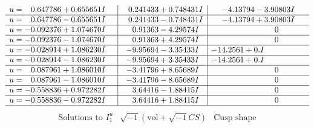 \documentclass[1p]{elsarticle_modified}
\theoremstyle{definition}
\newcommand{\I}{\sqrt{-1}}
\begin{document}
$$\begin{array}{c|c|c}
\begin{aligned}
u &= \phantom{-}0.647786 + 0.655651 I\end{aligned}
 & \phantom{-}0.241433 + 0.748431 I & -4.13794 - 3.90803 I \\ \hline\begin{aligned}
u &= \phantom{-}0.647786 - 0.655651 I\end{aligned}
 & \phantom{-}0.241433 - 0.748431 I & -4.13794 + 3.90803 I \\ \hline\begin{aligned}
u &= -0.092376 + 1.074670 I\end{aligned}
 & \phantom{-}0.91363 - 4.29574 I & \phantom{-0.000000 } 0 \\ \hline\begin{aligned}
u &= -0.092376 - 1.074670 I\end{aligned}
 & \phantom{-}0.91363 + 4.29574 I & \phantom{-0.000000 } 0 \\ \hline\begin{aligned}
u &= -0.028914 + 1.086230 I\end{aligned}
 & -9.95694 - 3.35433 I & -14.2561 + 0. I\phantom{ +0.000000I} \\ \hline\begin{aligned}
u &= -0.028914 - 1.086230 I\end{aligned}
 & -9.95694 + 3.35433 I & -14.2561 + 0. I\phantom{ +0.000000I} \\ \hline\begin{aligned}
u &= \phantom{-}0.087961 + 1.086010 I\end{aligned}
 & -3.41796 + 8.65689 I & \phantom{-0.000000 } 0 \\ \hline\begin{aligned}
u &= \phantom{-}0.087961 - 1.086010 I\end{aligned}
 & -3.41796 - 8.65689 I & \phantom{-0.000000 } 0 \\ \hline\begin{aligned}
u &= -0.558836 + 0.972282 I\end{aligned}
 & \phantom{-}3.64416 - 1.88415 I & \phantom{-0.000000 } 0 \\ \hline\begin{aligned}
u &= -0.558836 - 0.972282 I\end{aligned}
 & \phantom{-}3.64416 + 1.88415 I & \phantom{-0.000000 } 0\\
 \hline 
 \end{array}$$\newpage$$\begin{array}{c|c|c}  
\text{Solutions to }I^u_{1}& \I (\text{vol} + \sqrt{-1}CS) & \text{Cusp shape}\\

\end{array}$$
\end{document}

